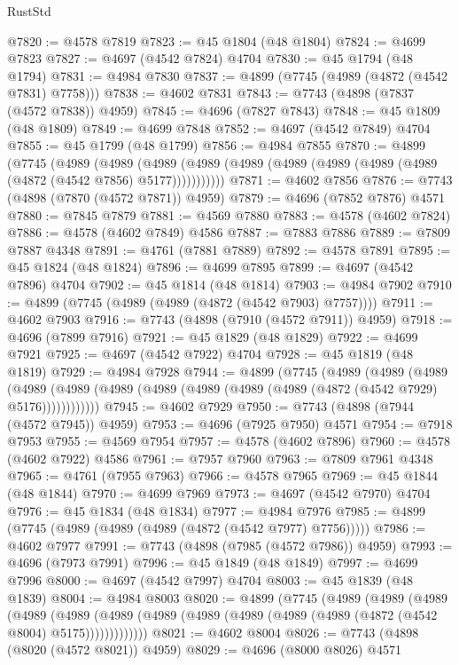 \begin{lexlean}{RustStd}
\begin{coremodule}
@7820 := @4578 @7819
@7823 := @45 @1804 (@48 @1804)
@7824 := @4699 @7823
@7827 := @4697 (@4542 @7824) @4704
@7830 := @45 @1794 (@48 @1794)
@7831 := @4984 @7830
@7837 := @4899 (@7745 (@4989 (@4872 (@4542 @7831) @7758)))
@7838 := @4602 @7831
@7843 := @7743 (@4898 (@7837 (@4572 @7838)) @4959)
@7845 := @4696 (@7827 @7843)
@7848 := @45 @1809 (@48 @1809)
@7849 := @4699 @7848
@7852 := @4697 (@4542 @7849) @4704
@7855 := @45 @1799 (@48 @1799)
@7856 := @4984 @7855
@7870 := @4899
    (@7745
      (@4989
        (@4989
          (@4989 (@4989 (@4989 (@4989 (@4989 (@4989 (@4989 (@4872 (@4542 @7856) @5177)))))))))))
@7871 := @4602 @7856
@7876 := @7743 (@4898 (@7870 (@4572 @7871)) @4959)
@7879 := @4696 (@7852 @7876) @4571
@7880 := @7845 @7879
@7881 := @4569 @7880
@7883 := @4578 (@4602 @7824)
@7886 := @4578 (@4602 @7849) @4586
@7887 := @7883 @7886
@7889 := @7809 @7887 @4348
@7891 := @4761 (@7881 @7889)
@7892 := @4578 @7891
@7895 := @45 @1824 (@48 @1824)
@7896 := @4699 @7895
@7899 := @4697 (@4542 @7896) @4704
@7902 := @45 @1814 (@48 @1814)
@7903 := @4984 @7902
@7910 := @4899 (@7745 (@4989 (@4989 (@4872 (@4542 @7903) @7757))))
@7911 := @4602 @7903
@7916 := @7743 (@4898 (@7910 (@4572 @7911)) @4959)
@7918 := @4696 (@7899 @7916)
@7921 := @45 @1829 (@48 @1829)
@7922 := @4699 @7921
@7925 := @4697 (@4542 @7922) @4704
@7928 := @45 @1819 (@48 @1819)
@7929 := @4984 @7928
@7944 := @4899
    (@7745
      (@4989
        (@4989
          (@4989
            (@4989 (@4989 (@4989 (@4989 (@4989 (@4989 (@4989 (@4872 (@4542 @7929) @5176))))))))))))
@7945 := @4602 @7929
@7950 := @7743 (@4898 (@7944 (@4572 @7945)) @4959)
@7953 := @4696 (@7925 @7950) @4571
@7954 := @7918 @7953
@7955 := @4569 @7954
@7957 := @4578 (@4602 @7896)
@7960 := @4578 (@4602 @7922) @4586
@7961 := @7957 @7960
@7963 := @7809 @7961 @4348
@7965 := @4761 (@7955 @7963)
@7966 := @4578 @7965
@7969 := @45 @1844 (@48 @1844)
@7970 := @4699 @7969
@7973 := @4697 (@4542 @7970) @4704
@7976 := @45 @1834 (@48 @1834)
@7977 := @4984 @7976
@7985 := @4899 (@7745 (@4989 (@4989 (@4989 (@4872 (@4542 @7977) @7756)))))
@7986 := @4602 @7977
@7991 := @7743 (@4898 (@7985 (@4572 @7986)) @4959)
@7993 := @4696 (@7973 @7991)
@7996 := @45 @1849 (@48 @1849)
@7997 := @4699 @7996
@8000 := @4697 (@4542 @7997) @4704
@8003 := @45 @1839 (@48 @1839)
@8004 := @4984 @8003
@8020 := @4899
    (@7745
      (@4989
        (@4989
          (@4989
            (@4989
              (@4989
                (@4989 (@4989 (@4989 (@4989 (@4989 (@4989 (@4872 (@4542 @8004) @5175)))))))))))))
@8021 := @4602 @8004
@8026 := @7743 (@4898 (@8020 (@4572 @8021)) @4959)
@8029 := @4696 (@8000 @8026) @4571

\end{coremodule}
\end{lexlean}
